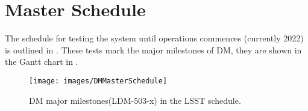 
\section{Master Schedule\label{sect:schedule}}

The schedule for testing the system until operations commences (currently 2022)
is outlined in .
These tests mark the major milestones of DM, they are shown in the Gantt chart in .




\begin{figure}[htbp]
        \begin{center}
                 \texttt{[image: images/DMMasterSchedule]}
                 \caption{DM major milestones(LDM-503-x) in the LSST schedule. \label{fig:schedule}}
         \end{center}
 \end{figure}

